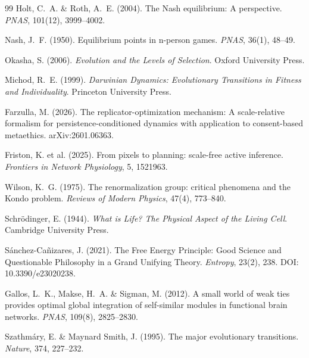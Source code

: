 \documentclass[12pt,a4paper]{article}
\theoremstyle{remark}
\begin{document}
\begin{thebibliography}{99}
Holt, C.~A. \& Roth, A.~E. (2004).
\newblock The Nash equilibrium: A perspective.
\newblock \textit{PNAS}, 101(12), 3999--4002.

Nash, J.~F. (1950).
\newblock Equilibrium points in n-person games.
\newblock \textit{PNAS}, 36(1), 48--49.


Okasha, S. (2006).
\newblock \textit{Evolution and the Levels of Selection}.
\newblock Oxford University Press.

Michod, R.~E. (1999).
\newblock \textit{Darwinian Dynamics: Evolutionary Transitions in Fitness and Individuality}.
\newblock Princeton University Press.

Farzulla, M. (2026).
\newblock The replicator-optimization mechanism: A scale-relative formalism for persistence-conditioned dynamics with application to consent-based metaethics.
\newblock arXiv:2601.06363.

Friston, K. et al. (2025).
\newblock From pixels to planning: scale-free active inference.
\newblock \textit{Frontiers in Network Physiology}, 5, 1521963.

Wilson, K.~G. (1975).
\newblock The renormalization group: critical phenomena and the Kondo problem.
\newblock \textit{Reviews of Modern Physics}, 47(4), 773--840.

Schr\"odinger, E. (1944).
\newblock \textit{What is Life? The Physical Aspect of the Living Cell}.
\newblock Cambridge University Press.

S\'anchez-Ca\~nizares, J. (2021).
\newblock The Free Energy Principle: Good Science and Questionable Philosophy in a Grand Unifying Theory.
\newblock \textit{Entropy}, 23(2), 238.
\newblock DOI: 10.3390/e23020238.

Gallos, L.~K., Makse, H.~A. \& Sigman, M. (2012).
\newblock A small world of weak ties provides optimal global integration of self-similar modules in functional brain networks.
\newblock \textit{PNAS}, 109(8), 2825--2830.

Szathm\'ary, E. \& Maynard Smith, J. (1995).
\newblock The major evolutionary transitions.
\newblock \textit{Nature}, 374, 227--232.


\end{thebibliography}
\end{document}
